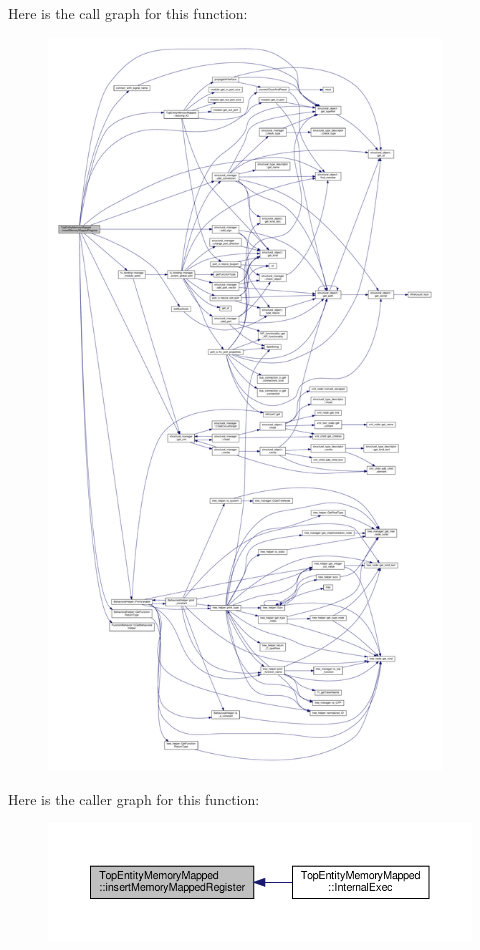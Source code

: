 Here is the call graph for this function\+:
\nopagebreak
\begin{figure}[H]
\begin{center}
\leavevmode
\includegraphics[height=550pt]{d1/db6/classTopEntityMemoryMapped_a3cce4e3db9f111fcb1a767dcb3ee1275_cgraph}
\end{center}
\end{figure}
Here is the caller graph for this function\+:
\nopagebreak
\begin{figure}[H]
\begin{center}
\leavevmode
\includegraphics[width=350pt]{d1/db6/classTopEntityMemoryMapped_a3cce4e3db9f111fcb1a767dcb3ee1275_icgraph}
\end{center}
\end{figure}
\mbox{\label{classTopEntityMemoryMapped_a4643e06f6203f9b1161ce578356eb6e5}} 
